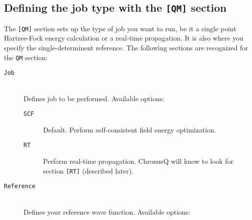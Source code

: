 \documentclass[12pt]{article}
\begin{document}
    \subsection{Defining the job type with the \texttt{[QM]} section} \label{subsec:QMInput}
    The \texttt{[QM]} section sets up the type of job you want to run, be it a single point Hartree-Fock energy calculation 
    or a real-time propagation. It is also where you specify the single-determinent reference. The following sections are
    recognized for the \texttt{QM} section: 
    \begin{description}
    \item[\texttt{Job}] \hfill \\
    Defines job to be performed. Available options:
      \begin{description}
      \item[\texttt{SCF}] Default. Perform self-consistent field energy optimization. 
      \item[\texttt{RT}] Perform real-time propagation. ChronusQ will know to look for section \texttt{[RT]} (described later). 
      \end{description}
    \item[\texttt{Reference}] \hfill \\
    Defines your reference wave function. Available options:

\end{description}
\end{document}
